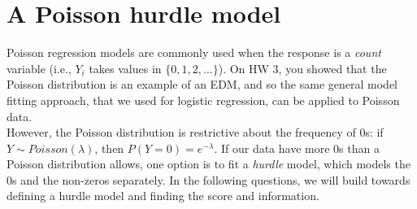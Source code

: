 \documentclass[11pt]{article}
\begin{document}
\newpage

\section*{A Poisson hurdle model}

Poisson regression models are commonly used when the response is a \textit{count} variable (i.e., $Y_i$ takes values in $\{0, 1, 2, ...\}$). On HW 3, you showed that the Poisson distribution is an example of an EDM, and so the same general model fitting approach, that we used for logistic regression, can be applied to Poisson data.\\

\noindent However, the Poisson distribution is restrictive about the frequency of 0s: if $Y \sim Poisson(\lambda)$, then $P(Y = 0) = e^{-\lambda}$. If our data have more 0s than a Poisson distribution allows, one option is to fit a \textit{hurdle} model, which models the 0s and the non-zeros separately. In the following questions, we will build towards defining a hurdle model and finding the score and information.\\
\end{document}
